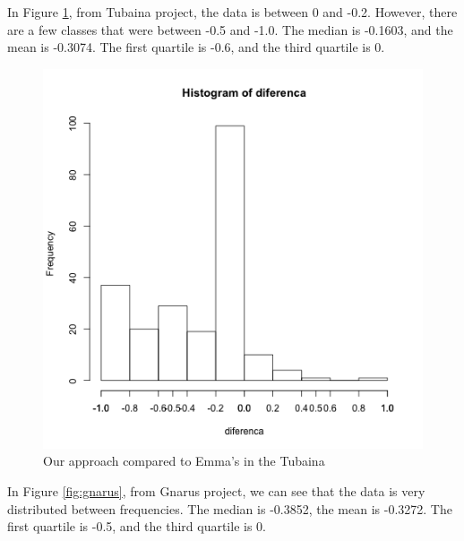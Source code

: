 \documentclass{sig-alternate}
\begin{document}
In Figure \ref{fig:tubaina}, from Tubaina project, the data is between
0 and -0.2. However, there are a few classes that were between -0.5 and -1.0. 
The median is -0.1603, and the mean is -0.3074. The first quartile is
-0.6, and the third quartile is 0.

\begin{figure}[h!H]
  \centering
  \includegraphics[scale=0.3]{../stats/tubaina-histograma-gelato.png}
  \caption{Our approach compared to Emma's in the Tubaina}
  \label{fig:tubaina}
\end{figure}


In Figure \ref{fig:gnarus}, from Gnarus project, we can see that the data is very
distributed between frequencies. The median is -0.3852, the mean is -0.3272. The first quartile
is -0.5, and the third quartile is 0.
\end{document}
